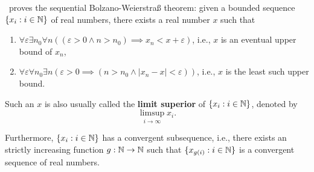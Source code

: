 \documentclass[../main.tex]{memoir}
\begin{document}
\begin{theorem}
  \label{thm:aca-bw}
  \aca\ proves the sequential Bolzano-Weierstra{\ss} theorem: given a bounded sequence $\{x_i: i \in \mathbb{N}\}$ of real numbers, there exists a real number $x$ such that

  \begin{enumerate}
  \item $\forall \varepsilon \exists n_0 \forall n ((\varepsilon > 0 \land n > n_0) \implies x_n < x + \varepsilon)$, i.e., $x$ is an eventual upper bound of $x_n$,
  \item $\forall \varepsilon \forall n_0 \exists n (\varepsilon > 0 \implies (n > n_0 \land |x_n - x| < \varepsilon))$, i.e., $x$ is the least such upper bound.
  \end{enumerate}

  Such an $x$ is also usually called the \textbf{limit superior} of $\{x_i: i \in \mathbb{N}\}$, denoted by
  \[ \limsup_{i \to \infty} x_i. \]

  Furthermore, $\{x_i: i \in \mathbb{N}\}$ has a convergent subsequence, i.e., there exists an strictly increasing function $g: \mathbb{N} \to \mathbb{N}$ such that $\{x_{g(i)}: i \in \mathbb{N}\}$ is a convergent sequence of real numbers.
\end{theorem}
\end{document}
